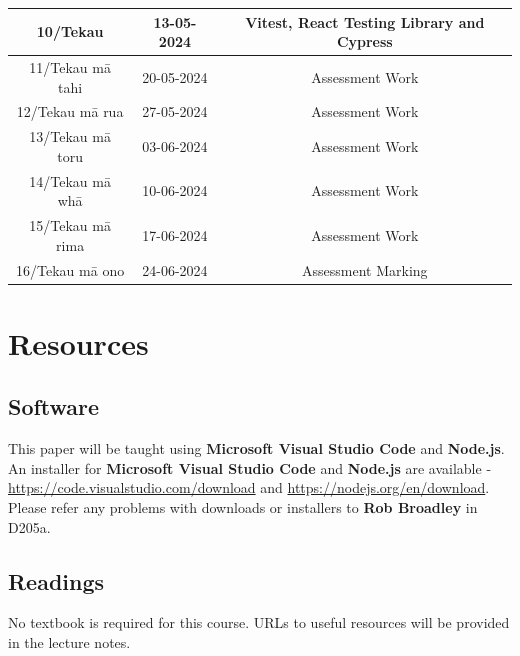 \documentclass{article}
\begin{document}
\begin{tabular}{|c|c|c|c|}
	\footnotesize 10/Tekau         & \footnotesize 13-05-2024 & \multicolumn{2}{c|}{\footnotesize Vitest, React Testing Library and Cypress}                                                                 \\ \hline
	\footnotesize 11/Tekau mā tahi & \footnotesize 20-05-2024 & \multicolumn{2}{c|}{\footnotesize Assessment Work}                                                                 \\ \hline
	\footnotesize 12/Tekau mā rua  & \footnotesize 27-05-2024 & \multicolumn{2}{c|}{\footnotesize Assessment Work}                                                                 \\ \hline
	\footnotesize 13/Tekau mā toru & \footnotesize 03-06-2024 & \multicolumn{2}{c|}{\footnotesize Assessment Work}                                                     \\ \hline
	\footnotesize 14/Tekau mā whā  & \footnotesize 10-06-2024 & \multicolumn{2}{c|}{\footnotesize Assessment Work} \\ \hline 
	\footnotesize 15/Tekau mā rima & \footnotesize 17-06-2024 & \multicolumn{2}{c|}{\footnotesize Assessment Work}                                                       \\ \hline
	\footnotesize 16/Tekau mā ono  & \footnotesize 24-06-2024 & \multicolumn{2}{c|}{\footnotesize Assessment Marking}                                                         \\ \hline
\end{tabular} 

\section*{Resources}

\subsection*{Software}
This paper will be taught using \textbf{Microsoft Visual Studio Code} and \textbf{Node.js}. An installer for \textbf{Microsoft Visual Studio Code} and \textbf{Node.js} are available - \href{https://code.visualstudio.com/download}{https://code.visualstudio.com/download} and \href{https://nodejs.org/en/download}{https://nodejs.org/en/download}. Please refer any problems with downloads or installers to \textbf{Rob Broadley} in D205a.

\subsection*{Readings}
No textbook is required for this course. URLs to useful resources will be provided in the lecture notes. 
\end{document}
